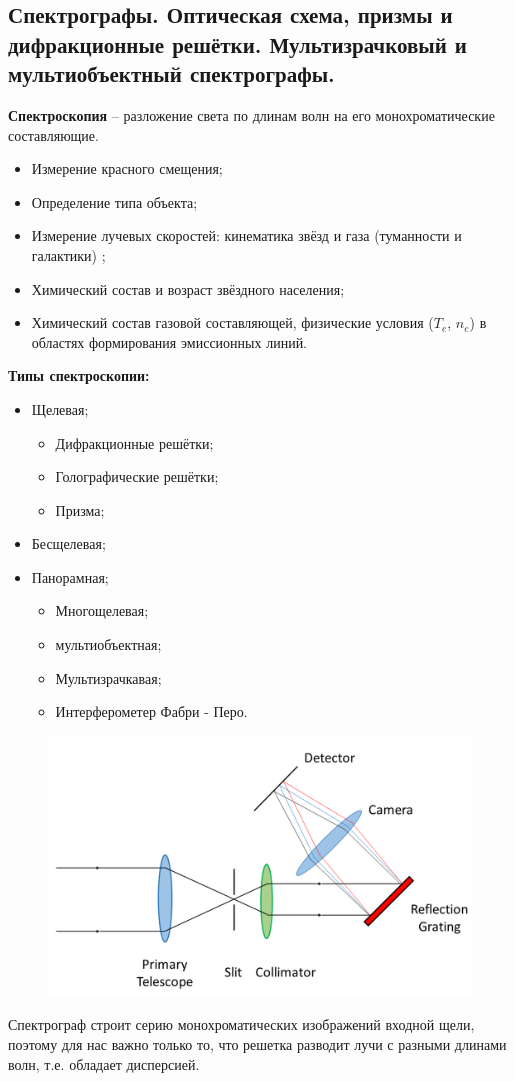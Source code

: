 \documentclass[12pt]{article}
\begin{document}
	\subsection{Спектрографы. Оптическая схема, призмы и дифракционные решётки. Мультизрачковый и мультиобъектный спектрографы.}
	
	\textbf{Спектроскопия} – разложение света по длинам волн на его
	монохроматические составляющие.
	
	\begin{itemize}
	
\item Измерение красного смещения;
	\item Определение типа объекта;
\item Измерение лучевых скоростей: кинематика звёзд и газа (туманности и
	галактики) ;
\item Химический состав и возраст звёздного населения;
\item Химический состав газовой составляющей, физические условия ($T_e$, $n_e$) в областях формирования эмиссионных линий.
\end{itemize}


\textbf{Типы спектроскопии:}
	\begin{itemize}
\item Щелевая;
	\begin{itemize}
\item Дифракционные решётки;
\item Голографические решётки;
\item Призма;
\end{itemize}
\item Бесщелевая;
\item Панорамная;
	\begin{itemize}
\item Многощелевая; 
\item мультиобъектная;
\item Мультизрачкавая;
\item Интерферометер Фабри - Перо.
\end{itemize}
\end{itemize}
\newpage
\begin{figure}[h]
	\centering
	\includegraphics[width=0.7\linewidth]{Схема_спектрографа_с_дифракционной_решеткой}
\end{figure}
Спектрограф строит серию монохроматических изображений входной
щели, поэтому для нас важно только то, что решетка разводит лучи с
разными длинами волн, т.е. обладает дисперсией.
\end{document}
